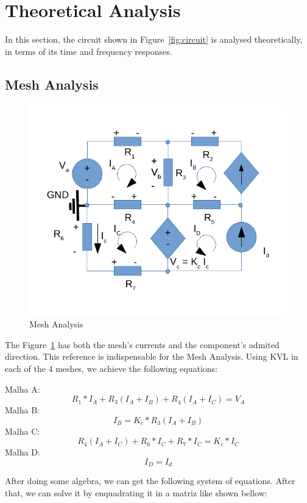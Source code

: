 \section{Theoretical Analysis}
\label{sec:analysis}

In this section, the circuit shown in Figure~\ref{fig:circuit} is analysed
theoretically, in terms of its time and frequency responses.

\subsection{Mesh Analysis}

\begin{figure}
\includegraphics[width=0.4\linewidth]{circ_mesh.pdf}
\caption{Mesh Analysis}
\label{fig:circuitMesh}
\end{figure}

The Figure~\ref{fig:circuitMesh} has both the mesh's currents and the 
component's admited direction.
This reference is indispensable for the Mesh Analysis.
Using KVL in each of the 4 meshes, we achieve the following equations:

Malha A:
$$ R_1 * I_A + R_3(I_A+I_B) + R_4(I_A+I_C) = V_A$$
Malha B:
$$ I_B = K_c * R_3(I_A + I_B) $$
Malha C:
$$ R_4(I_A + I_C) + R_6 * I_C + R_7 * I_C = K_c * I_C $$
Malha D:
$$ I_D = I_d $$

After doing some algebra, we can get the following system of equations. After that, 
we can solve it by enquadrating it in a matriz like shown bellow:

